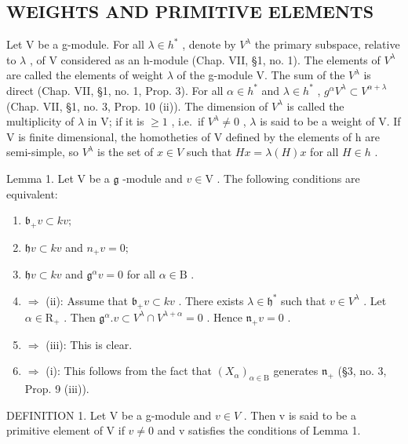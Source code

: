 \subsection{WEIGHTS AND PRIMITIVE ELEMENTS}

Let V be a g-module. For all \(\lambda\in h^{*}\) , denote by \(V^{\lambda}\) the primary subspace, relative to \(\lambda\) , of V considered as an h-module (Chap. VII, §1, no. 1). The elements of \(V^{\lambda}\) are called the elements of weight \(\lambda\) of the g-module V. The sum of the \(V^{\lambda}\) is direct (Chap. VII, §1, no. 1, Prop. 3). For all \(\alpha\in h^{*}\) and \(\lambda\in h^{*}\) , \(g^{\alpha}V^{\lambda}\subset V^{\alpha+\lambda}\) (Chap. VII, §1, no. 3, Prop. 10 (ii)). The dimension of \(V^{\lambda}\) is called the multiplicity of \(\lambda\) in V; if it is \(\geq1\) , i.e.~if \(V^{\lambda}\neq0\) , \(\lambda\) is said to be a weight of V. If V is finite dimensional, the homotheties of V defined by the elements of h are semi-simple, so \(V^{\lambda}\) is the set of \(x\in V\) such that \(Hx=\lambda(H)x\) for all \(H\in h\) .

Lemma 1. Let \(\mathrm{V}\) be a \(\mathfrak{g}\) -module and \(v \in \mathrm{V}\) . The following conditions are equivalent:

\begin{enumerate}
\def\labelenumi{(\roman{enumi})}
\item
  \(\mathfrak{b}_{+}v\subset kv;\)
\item
  \(\mathfrak{h}v \subset kv\) and \(n_{+}v = 0;\)
\item
  \(\mathfrak{h}v\subset kv\) and \(\mathfrak{g}^{\alpha}v = 0\) for all \(\alpha \in \mathrm{B}\) .
\item
  \(\Longrightarrow\) (ii): Assume that \(\mathfrak{b}_{+}v\subset kv\) . There exists \(\lambda \in \mathfrak{h}^*\) such that \(v\in V^{\lambda}\) . Let \(\alpha \in \mathrm{R}_{+}\) . Then \(\mathfrak{g}^{\alpha}.v\subset V^{\lambda}\cap V^{\lambda +\alpha} = 0\) . Hence \(\mathfrak{n}_{+}v = 0\) .
\item
  \(\Longrightarrow\) (iii): This is clear.
\item
  \(\Longrightarrow\) (i): This follows from the fact that \((X_{\alpha})_{\alpha \in \mathrm{B}}\) generates \(\mathfrak{n}_{+}\) (§3, no. 3, Prop. 9 (iii)).
\end{enumerate}

DEFINITION 1. Let V be a g-module and \(v \in V\) . Then v is said to be a primitive element of V if \(v \neq 0\) and v satisfies the conditions of Lemma 1.

